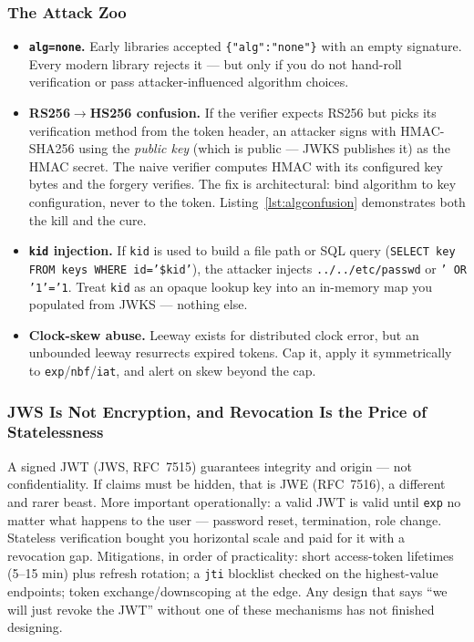 \subsubsection{The Attack Zoo}

\begin{itemize}
  \item \textbf{\texttt{alg=none}.} Early libraries accepted
        \texttt{\{"alg":"none"\}} with an empty signature. Every modern
        library rejects it --- but only if you do not hand-roll verification
        or pass attacker-influenced algorithm choices.
  \item \textbf{RS256$\rightarrow$HS256 confusion.} If the verifier expects
        RS256 but picks its verification method from the token header, an
        attacker signs with HMAC-SHA256 using the \emph{public key} (which
        is public --- JWKS publishes it) as the HMAC secret. The naive
        verifier computes HMAC with its configured key bytes and the forgery
        verifies. The fix is architectural: bind algorithm to key
        configuration, never to the token. Listing~\ref{lst:algconfusion}
        demonstrates both the kill and the cure.
  \item \textbf{\texttt{kid} injection.} If \texttt{kid} is used to build a
        file path or SQL query
        (\texttt{SELECT key FROM keys WHERE id='\$kid'}), the attacker
        injects \texttt{../../etc/passwd} or \texttt{' OR '1'='1}. Treat
        \texttt{kid} as an opaque lookup key into an in-memory map you
        populated from JWKS --- nothing else.
  \item \textbf{Clock-skew abuse.} Leeway exists for distributed clock
        error, but an unbounded leeway resurrects expired tokens. Cap it,
        apply it symmetrically to \texttt{exp}/\texttt{nbf}/\texttt{iat},
        and alert on skew beyond the cap.
\end{itemize}

\subsubsection{JWS Is Not Encryption, and Revocation Is the Price of Statelessness}

A signed JWT (JWS, RFC~7515) guarantees integrity and origin --- not
confidentiality. If claims must be hidden, that is JWE (RFC~7516), a
different and rarer beast. More important operationally: a valid JWT is
valid until \texttt{exp} no matter what happens to the user --- password
reset, termination, role change. Stateless verification bought you
horizontal scale and paid for it with a revocation gap. Mitigations, in
order of practicality: short access-token lifetimes (5--15 min) plus refresh
rotation; a \texttt{jti} blocklist checked on the highest-value endpoints;
token exchange/downscoping at the edge. Any design that says ``we will just
revoke the JWT'' without one of these mechanisms has not finished designing.

